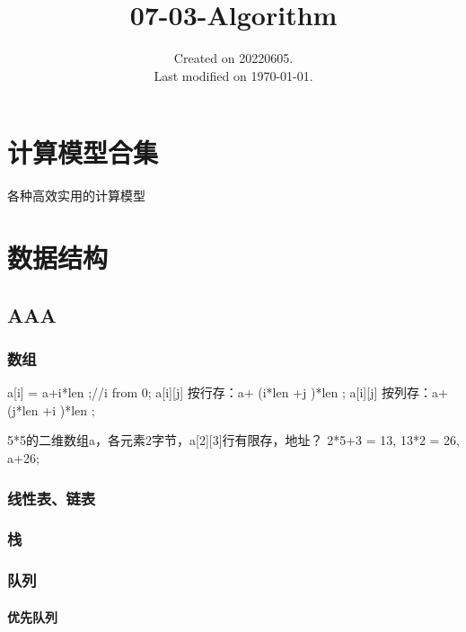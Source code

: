 \documentclass[UTF8]{../computerUniverse}
\begin{document}
\title{07-03-Algorithm}
\date{Created on 20220605.\\   Last modified on \today.}
\maketitle
\tableofcontents








\chapter{计算模型合集}
各种高效实用的计算模型










\chapter{数据结构}

\section{AAA}


\subsection{数组}
 a[i] = a+i*len ;//i from 0;
 a[i][j]  按行存：a+ (i*len +j )*len ;
 a[i][j]  按列存：a+ (j*len +i )*len ;

 5*5的二维数组a，各元素2字节，a[2][3]行有限存，地址？
 2*5+3 = 13, 13*2 = 26, a+26;


\subsection{线性表、链表}



\subsection{栈}


\subsection{队列}

\subsubsection{优先队列}
\end{document}
